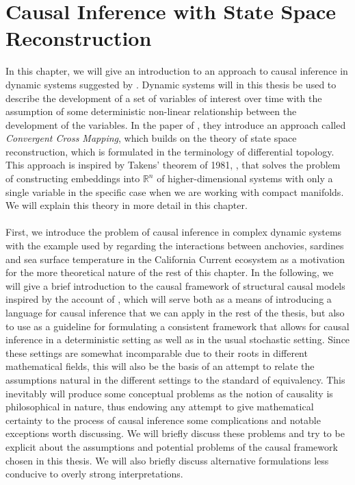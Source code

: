 \documentclass[11pt, a4paper]{memoir}
\theoremstyle{plain}
\theoremstyle{definition}
\newcommand{\mR}{\mathbb{R}}
\begin{document}
\chapter{Causal Inference with State Space Reconstruction}
In this chapter, we will give an introduction to an approach to causal inference in dynamic systems suggested by \cite{Sugihara}. Dynamic systems will in this thesis be used to describe the development of a set of variables of interest over time with the assumption of some deterministic non-linear relationship between the development of the variables. In the paper of \cite{Sugihara}, they introduce an approach called \textit{Convergent Cross Mapping}, which builds on the theory of state space reconstruction, which is formulated in the terminology of differential topology. This approach is inspired by Takens' theorem of 1981, \cite{Takens}, that solves the problem of constructing embeddings into $\mR^n$ of higher-dimensional systems with only a single variable in the specific case when we are working with compact manifolds. We will explain this theory in more detail in this chapter.\\\\
First, we introduce the problem of causal inference in complex dynamic systems with the example used by \cite{Sugihara} regarding the interactions between anchovies, sardines and sea surface temperature in the California Current ecosystem as a motivation for the more theoretical nature of the rest of this chapter. In the following, we will give a brief introduction to the causal framework of structural causal models inspired by the account of \cite{Peters}, which will serve both as a means of introducing a language for causal inference that we can apply in the rest of the thesis, but also to use as a guideline for formulating a consistent framework that allows for causal inference in a deterministic setting as well as in the usual stochastic setting. Since these settings are somewhat incomparable due to their roots in different mathematical fields, this will also be the basis of an attempt to relate the assumptions natural in the different settings to the standard of equivalency. This inevitably will produce some conceptual problems as the notion of causality is philosophical in nature, thus endowing any attempt to give mathematical certainty to the process of causal inference some complications and notable exceptions worth discussing. We will briefly discuss these problems and try to be explicit about the assumptions and potential problems of the causal framework chosen in this thesis. We will also briefly discuss alternative formulations less conducive to overly strong interpretations.\\\\
\end{document}
